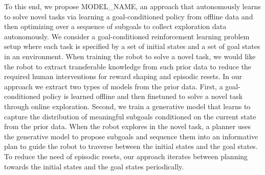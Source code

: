 To this end, we propose MODEL\_NAME, an approach that autonomously learns to solve novel tasks via learning a goal-conditioned policy from offline data and then optimizing over a sequence of subgoals to collect exploration data autonomously.
We consider a goal-conditioned reinforcement learning problem setup where each task is specified by a set of initial states and a set of goal states in an environment. 
When training the robot to solve a novel task, we would like the robot to extract transferable knowledge from such prior data to reduce the required human interventions for reward shaping and episodic resets.
In our approach we extract two types of models from the prior data.
First, a goal-conditioned policy is learned offline 
and then finetuned to solve a novel task through online exploration.
Second, we train a generative model that learns to capture the distribution of meaningful subgoals
conditioned on the current state from the prior data.
When the robot explores in the novel task, a planner uses the generative model to propose subgoals and sequence them into an informative plan to guide the robot to traverse between the initial states and the goal states.
To reduce the need of episodic resets, our approach iterates between planning towards the initial states and the goal states periodically.

